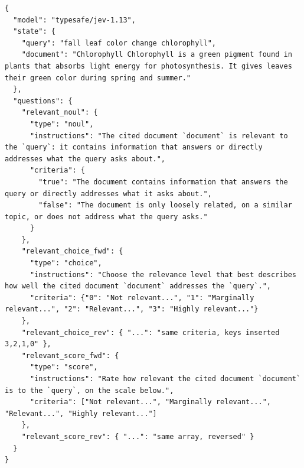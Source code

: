 \documentclass[
  10pt,
]{article}
\begin{document}
\begin{lstlisting}
{
  "model": "typesafe/jev-1.13",
  "state": {
    "query": "fall leaf color change chlorophyll",
    "document": "Chlorophyll Chlorophyll is a green pigment found in plants that absorbs light energy for photosynthesis. It gives leaves their green color during spring and summer."
  },
  "questions": {
    "relevant_noul": {
      "type": "noul",
      "instructions": "The cited document `document` is relevant to the `query`: it contains information that answers or directly addresses what the query asks about.",
      "criteria": {
        "true": "The document contains information that answers the query or directly addresses what it asks about.",
        "false": "The document is only loosely related, on a similar topic, or does not address what the query asks."
      }
    },
    "relevant_choice_fwd": {
      "type": "choice",
      "instructions": "Choose the relevance level that best describes how well the cited document `document` addresses the `query`.",
      "criteria": {"0": "Not relevant...", "1": "Marginally relevant...", "2": "Relevant...", "3": "Highly relevant..."}
    },
    "relevant_choice_rev": { "...": "same criteria, keys inserted 3,2,1,0" },
    "relevant_score_fwd": {
      "type": "score",
      "instructions": "Rate how relevant the cited document `document` is to the `query`, on the scale below.",
      "criteria": ["Not relevant...", "Marginally relevant...", "Relevant...", "Highly relevant..."]
    },
    "relevant_score_rev": { "...": "same array, reversed" }
  }
}
\end{lstlisting}
\end{document}
